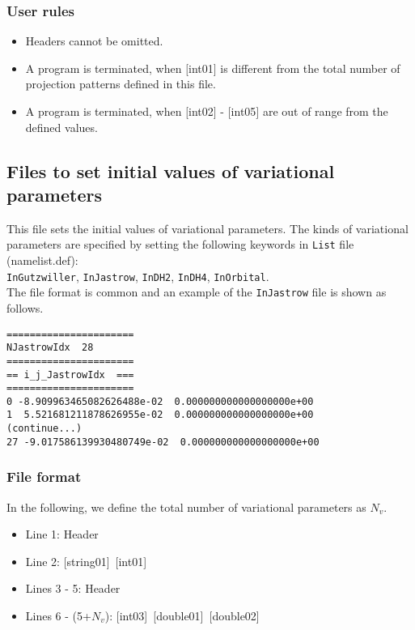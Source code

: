 \subsubsection{User rules}
\begin{itemize}
\item Headers cannot be omitted. 
\item A program is terminated, when $[$int01$]$ is different from the total number of projection patterns defined in this file.
\item A program is terminated, when $[$int02$]$ - $[$int05$]$ are out of range from the defined values.
\end{itemize}

\newpage
\subsection{Files to set initial values of variational parameters}
\label{Subsec:InputParam}
This file sets the initial values of variational parameters.
The kinds of variational parameters are specified by setting the following keywords in \verb|List| file (namelist.def):\\
\verb|InGutzwiller|, \verb|InJastrow|, \verb|InDH2|, \verb|InDH4|, \verb|InOrbital|.\\
The file format is common and an example of the \verb|InJastrow| file is shown as follows.

\begin{minipage}{12.5cm}
\begin{screen}
\begin{verbatim}
======================
NJastrowIdx  28
====================== 
== i_j_JastrowIdx  ===
====================== 
0 -8.909963465082626488e-02  0.000000000000000000e+00
1  5.521681211878626955e-02  0.000000000000000000e+00
(continue...)
27 -9.017586139930480749e-02  0.000000000000000000e+00
\end{verbatim}
\end{screen}
\end{minipage}

\subsubsection{File format}
In the following, we define the total number of variational parameters as $N_v$.
 \begin{itemize}
   \item  Line 1: Header
   \item  Line 2: [string01]~[int01]
   \item  Lines 3 - 5:  Header
   \item  Lines 6 - (5+$N_v$): [int03]~[double01]~[double02]
  \end{itemize}
